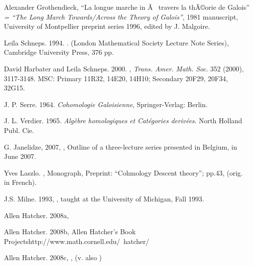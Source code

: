 \documentclass[12pt]{article}
\theoremstyle{plain}
\theoremstyle{definition}
\numberwithin{equation}{section}
\begin{document}
\begin{thebibliography}{99}
Alexander Grothendieck, ``La longue marche in Ã  travers la thÃ©orie de Galois'' 
\emph{= ``The Long March Towards/Across the Theory of Galois''}, 1981 manuscript, University of Montpellier preprint series 1996, edited by J. Malgoire. 

Leila Schneps. 1994. 
.
(London Mathematical Society Lecture Note Series), Cambridge University Press, 376 pp.

David Harbater and Leila Schneps. 2000.
, \emph{Trans. Amer. Math. Soc}. 352 (2000), 3117-3148. 
MSC: Primary 11R32, 14E20, 14H10; Secondary 20F29, 20F34, 32G15.

J. P. Serre. 1964. {\em Cohomologie Galoisienne}, Springer-Verlag: Berlin.

J. L. Verdier. 1965. {\em Alg\`ebre homologiques et Cat\'egories deriv\'ees}. North Holland Publ. Cie.

G. Janelidze, 2007, , Outline of a three-lecture series presented in Belgium, in June 2007. 

Yves Laszlo. ,
Monograph, Preprint: ``Cohmology Descent theory''; pp.43, (orig. in French).

J.S. Milne. 1993, 
, taught at the University of Michigan, Fall 1993. 
 
Allen Hatcher. 2008a,

Allen Hatcher. 2008b,
{Allen Hatcher's Book Projects}{http://www.math.cornell.edu/~hatcher/}

Allen Hatcher. 2008c, ,
(v. also )

\end{thebibliography}
\end{document}
